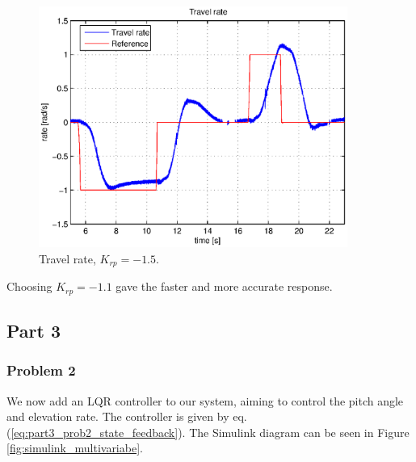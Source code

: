 \begin{figure}[htb]
\begin{minipage}{.5\textwidth}
        \label{fig:travel_half}
    \end{minipage}%
    \begin{minipage}{.5\textwidth} 
    \centering 
		\includegraphics[width=0.9\textwidth]{plots/part2new/travel_rate_1_5.eps}
	    \caption{Travel rate, $K_{rp} = -1.5$.}
        \label{fig:travel_1_5}
    \end{minipage}
    
\end{figure}
Choosing $K_{rp} = -1.1$ gave the faster and more accurate response.


\subsection{Part 3}
\subsubsection{Problem 2}



We now add an LQR controller to our system, aiming to control the pitch angle and elevation rate. The controller is given by eq. (\ref{eq:part3_prob2_state_feedback}). The Simulink diagram can be seen in Figure \ref{fig:simulink_multivariabe}.\medskip

